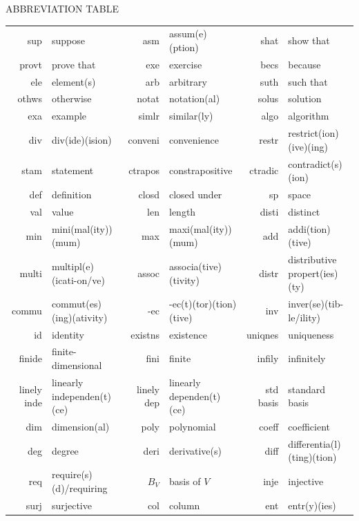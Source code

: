 {\begin{center}
\vspace{14pt}
{\large A{\footnotesize BBREVIATION} T{\footnotesize ABLE}}\vspace{8pt}\par
\begin{tabularx}{1.00\textwidth}{
		  r |
		| >{\raggedright\arraybackslash}X | r |
		| >{\raggedright\arraybackslash}X | r |
		| >{\raggedright\arraybackslash}X }
	\hline
sup&			suppose						& asm&			assum(e)(ption)				& shat&			show that\\
provt&			prove that					& exe&			exercise					& becs&			because\\
ele&			element(s)					& arb&			arbitrary					& suth&			such that\\
othws&			otherwise					& notat&		notation(al)				& solus&		solution\\
exa&			example						& simlr&		similar(ly)					& algo&			algorithm\\
div&			div(ide)(ision)				& conveni&		convenience					& restr&		restrict(ion)(ive)(ing)\\
stam&			statement					& ctrapos&		constrapositive				& ctradic&		contradict(s)(ion)\\
def&			definition					& closd&		closed under				& sp&			space\\
val&			value						& len&			length						& disti&		distinct\\
min&			mini(mal(ity))(mum)			& max&			maxi(mal(ity))(mum)			& add&			addi(tion)(tive)\\
multi&			multipl(e)(icati-on/ve)		& assoc&		associa(tive)(tivity)		& distr&		distributive propert(ies)(ty)\\
commu&			commut(es)(ing)(ativity)	& -ec&			-ec(t)(tor)(tion)(tive)		& inv&			inver(se)(tib-le/ility)\\
id&				identity					& existns&		existence					& uniqnes&		uniqueness\\
finide&			finite-dimensional			& fini&			finite						& infily&		infinitely\\
linely inde&	linearly independen(t)(ce)	& linely dep&	linearly dependen(t)(ce)	& std basis&	standard basis\\
dim&			dimension(al)				& poly&			polynomial					& coeff&		coefficient\\
deg&			degree						& deri&			derivative(s)				& diff&			differentia(l)(ting)(tion)\\
req&			require(s)(d)/requiring		& $B_V$&		basis of $V$				& inje&			injective\\
surj&			surjective					& col&			column						& ent&			entr(y)(ies)\\

\end{tabularx}
\end{center}}
